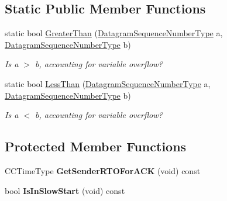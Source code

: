 \subsection*{Static Public Member Functions}
\begin{DoxyCompactItemize}
\item 
\hypertarget{class_rak_net_1_1_c_c_rak_net_sliding_window_aee276120dfc2af98db28843bebbe20bb}{static bool \hyperlink{class_rak_net_1_1_c_c_rak_net_sliding_window_aee276120dfc2af98db28843bebbe20bb}{Greater\-Than} (\hyperlink{struct_rak_net_1_1uint24__t}{Datagram\-Sequence\-Number\-Type} a, \hyperlink{struct_rak_net_1_1uint24__t}{Datagram\-Sequence\-Number\-Type} b)}\label{class_rak_net_1_1_c_c_rak_net_sliding_window_aee276120dfc2af98db28843bebbe20bb}

\begin{DoxyCompactList}\small\item\em Is a $>$ b, accounting for variable overflow? \end{DoxyCompactList}\item 
\hypertarget{class_rak_net_1_1_c_c_rak_net_sliding_window_ad748dfbe81cccdc218650eb2a0652d78}{static bool \hyperlink{class_rak_net_1_1_c_c_rak_net_sliding_window_ad748dfbe81cccdc218650eb2a0652d78}{Less\-Than} (\hyperlink{struct_rak_net_1_1uint24__t}{Datagram\-Sequence\-Number\-Type} a, \hyperlink{struct_rak_net_1_1uint24__t}{Datagram\-Sequence\-Number\-Type} b)}\label{class_rak_net_1_1_c_c_rak_net_sliding_window_ad748dfbe81cccdc218650eb2a0652d78}

\begin{DoxyCompactList}\small\item\em Is a $<$ b, accounting for variable overflow? \end{DoxyCompactList}\end{DoxyCompactItemize}
\subsection*{Protected Member Functions}
\begin{DoxyCompactItemize}
\item 
\hypertarget{class_rak_net_1_1_c_c_rak_net_sliding_window_a85a60864b0b65aadccb8538e27a387db}{C\-C\-Time\-Type {\bfseries Get\-Sender\-R\-T\-O\-For\-A\-C\-K} (void) const }\label{class_rak_net_1_1_c_c_rak_net_sliding_window_a85a60864b0b65aadccb8538e27a387db}

\item 
\hypertarget{class_rak_net_1_1_c_c_rak_net_sliding_window_ab37242e98e6c988f769cba0434fae5f6}{bool {\bfseries Is\-In\-Slow\-Start} (void) const }\label{class_rak_net_1_1_c_c_rak_net_sliding_window_ab37242e98e6c988f769cba0434fae5f6}

\end{DoxyCompactItemize}
